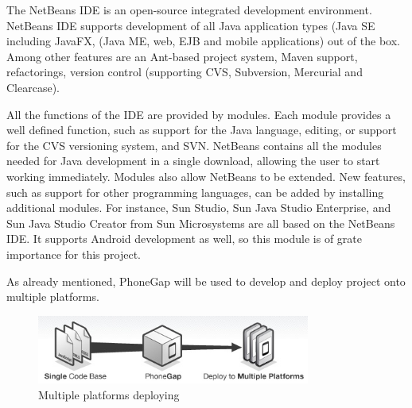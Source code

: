 The NetBeans IDE is an open-source integrated development environment. NetBeans IDE supports development of all Java application types (Java SE including JavaFX, (Java ME, web, EJB and mobile applications) out of the box. Among other features are an Ant-based project system, Maven support, refactorings, version control (supporting CVS, Subversion, Mercurial and Clearcase).

All the functions of the IDE are provided by modules. Each module provides a well defined function, such as support for the Java language, editing, or support for the CVS versioning system, and SVN. NetBeans contains all the modules needed for Java development in a single download, allowing the user to start working immediately. Modules also allow NetBeans to be extended. New features, such as support for other programming languages, can be added by installing additional modules. For instance, Sun Studio, Sun Java Studio Enterprise, and Sun Java Studio Creator from Sun Microsystems are all based on the NetBeans IDE. It supports Android development as well, so this module is of grate importance for this project.

As already mentioned, PhoneGap will be used to develop and deploy project onto multiple platforms.\newline
\begin{figure}[phonegap]
	\centering
	\includegraphics[width=0.8\textwidth]{prestudy/development_environment/PhoneGap.jpg}
	\caption{Multiple platforms deploying}
	\label{fig:phonegap}
\end{figure}
